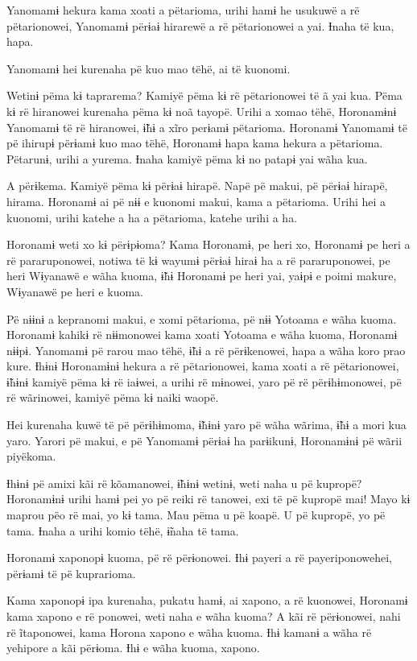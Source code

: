  

 

 

 

Yanomamɨ hekura kama xoati a pëtarioma, urihi hamɨ he usukuwë a rë
pëtarionowei, Yanomamɨ përɨaɨ hirarewë a rë pëtarionowei a yai. Ɨnaha të
kua, hapa. 

Yanomamɨ hei kurenaha pë kuo mao tëhë, ai të kuonomi. 

Wetinɨ pëma kɨ taprarema? Kamiyë pëma kɨ rë pëtarionowei të ã yai kua.
Pëma kɨ rë hiranowei kurenaha pëma kɨ noã tayopë. Urihi a xomao tëhë,
Horonamɨnɨ Yanomamɨ të rë hiranowei, ɨ̃hɨ a xĩro perɨamɨ pëtarioma.
Horonamɨ Yanomamɨ të pë ihirupɨ përɨamɨ kuo mao tëhë, Horonamɨ hapa kama
hekura a pëtarioma. Pëtarunɨ, urihi a yurema. Ɨnaha kamiyë pëma kɨ no
patapɨ yai wãha kua. 

A përɨkema. Kamiyë pëma kɨ përɨaɨ hirapë. Napë pë makui, pë përɨaɨ
hirapë, hirama. Horonamɨ ai pë nɨɨ e kuonomi makui, kama a pëtarioma.
Urihi hei a kuonomi, urihi katehe a ha a pëtarioma, katehe urihi a ha. 

Horonamɨ weti xo kɨ përɨpɨoma? Kama Horonamɨ, pe heri xo, Horonamɨ pe
heri a rë pararuponowei, notiwa të kɨ wayumɨ përɨaɨ hiraɨ ha a rë
pararuponowei, pe heri Wɨyanawë e wãha kuoma, ɨ̃hɨ Horonamɨ pe heri yai,
yaɨpɨ e poimi makure, Wɨyanawë pe heri e kuoma. 

Pë nɨɨnɨ a kepranomi makui, e xomi pëtarioma, pë nɨɨ Yotoama e wãha
kuoma. Horonamɨ kahikɨ rë nɨɨmonowei kama xoati Yotoama e wãha kuoma,
Horonamɨ nɨɨpɨ. Yanomamɨ pë rarou mao tëhë, ɨ̃hɨ a rë përɨkenowei, hapa a
wãha koro prao kure. Ɨhɨnɨ Horonamɨnɨ hekura a rë pëtarionowei, kama
xoati a rë pëtarionowei, ɨ̃hɨnɨ kamiyë pëma kɨ rë iaɨwei, a urihi rë
mɨnowei, yaro pë rë përɨhɨmonowei, pë rë wãrinowei, kamiyë pëma kɨ naiki
waopë. 

Hei kurenaha kuwë të pë përɨhɨmoma, ɨ̃hɨnɨ yaro pë wãha wãrima, ɨ̃hɨ a
mori kua yaro. Yarori pë makui, e pë Yanomamɨ përɨaɨ ha parɨikunɨ,
Horonamɨnɨ pë wãrii piyëkoma. 

Ɨhɨnɨ pë amixi kãi rë kõamanowei, ɨ̃hɨnɨ wetinɨ, weti naha u pë kupropë?
Horonamɨnɨ urihi hamɨ pei yo pë reiki rë tanowei, exi të pë kupropë mai!
Mayo kɨ maprou pëo rë mai, yo kɨ tama. Mau pëma u pë koapë. U pë
kupropë, yo pë tama. Ɨnaha a urihi komio tëhë, ɨ̃naha të tama. 

Horonamɨ xaponopɨ kuoma, pë rë përɨonowei. Ɨhɨ payeri a rë
payeriponowehei, përɨamɨ të pë kuprarioma. 

Kama xaponopɨ ipa kurenaha, pukatu hamɨ, ai xapono, a rë kuonowei,
Horonamɨ kama xapono e rë ponowei, weti naha e wãha kuoma? A kãi rë
përɨonowei, nahi rë ĩtaponowei, kama Horona xapono e wãha kuoma. Ɨhɨ
kamanɨ a wãha rë yehipore a kãi përɨoma. Ɨhɨ e wãha kuoma, xapono. 

